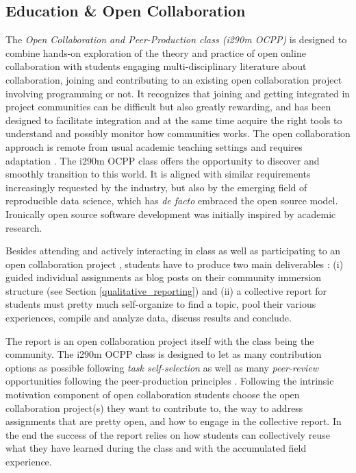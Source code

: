 \subsection{Education \& Open Collaboration}
\label{classmotivations}

The {\it Open Collaboration and Peer-Production class (i290m OCPP)} is designed to combine hands-on exploration of the theory and practice of open online collaboration with students engaging multi-disciplinary literature about collaboration, joining and contributing to an existing open collaboration project involving programming or not. It recognizes that joining and getting integrated in project communities can be difficult but also greatly rewarding, and has been designed to facilitate integration and at the same time acquire the right tools to understand and possibly monitor how communities works. The open collaboration approach is remote from usual academic teaching settings and requires adaptation . The i290m OCPP class offers the opportunity to discover and smoothly transition to this world. It is aligned with similar requirements increasingly requested by the industry, but also by the emerging field of reproducible data science, which has {\it de facto} embraced the open source model. Ironically open source software development  was initially inspired by academic research\cite{bezroukov1999oss}.

Besides attending and actively interacting in class as well as participating to an open collaboration project  \cite{classweb2013}, students have to produce two main deliverables : (i) guided individual assignments as blog posts on their community immersion structure (see Section \ref{qualitative_reporting}) and (ii) a collective report for students must pretty much self-organize to find a topic, pool their various experiences, compile and analyze data, discuss results and conclude. 

The report is an open collaboration project itself with the class being the community. The i290m OCPP class is designed to let as many contribution options as possible following {\it task self-selection} as well as many {\it peer-review} opportunities following the peer-production principles \cite{benkler2002}. Following the intrinsic motivation component of open collaboration students choose the open collaboration project(s) they want to contribute to, the way to address assignments that are pretty open, and how to engage in the collective report. In the end the success of the report relies on how students can collectively reuse what they have learned during the class and with the accumulated field experience. 


